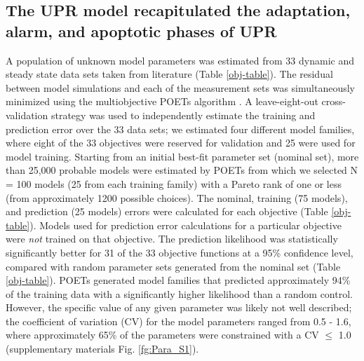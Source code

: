 \documentclass[fleqn,10pt]{wlscirep}
\begin{document}

\subsection*{The UPR model recapitulated the adaptation, alarm, and apoptotic phases of UPR}
A population of unknown model parameters was estimated from 33 dynamic and steady state data sets taken from literature (Table \ref{obj-table}).
The residual between model simulations and each of the measurement sets was simultaneously minimized using the multiobjective POETs algorithm \cite{Song:2010ij}.
A leave-eight-out cross-validation strategy was used to independently estimate the training and prediction error over the 33 data sets; we estimated four different model families,
where eight of the 33 objectives were reserved for validation and 25 were used for model training.
Starting from an initial best-fit parameter set (nominal set), more than 25,000 probable models were estimated by POETs from which we selected N = 100 models (25 from each training family) with a Pareto rank of one or less (from approximately 1200 possible choices).
The nominal, training (75 models), and prediction (25 models) errors were calculated for each objective (Table \ref{obj-table}).
Models used for prediction error calculations for a particular objective were \emph{not} trained on that objective.
The prediction likelihood was statistically significantly better for 31 of the 33 objective functions at a 95\% confidence level, compared with random parameter sets generated from the nominal set (Table \ref{obj-table}).
POETs generated model families that predicted approximately 94\% of the training data with a significantly higher likelihood than a random control.
However, the specific value of any given parameter was likely not well described; the coefficient of variation (CV) for the model parameters ranged from 0.5 - 1.6, where approximately 65\% of the parameters were constrained with a CV $\leq$ 1.0 (supplementary materials Fig. \ref{fg:Para_S1}).
\end{document}
